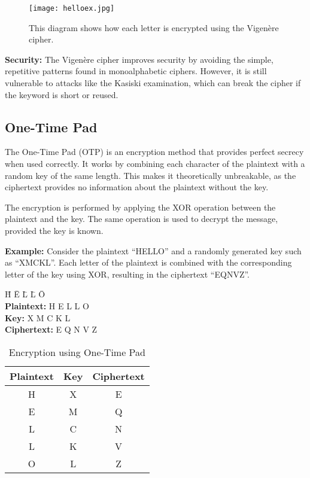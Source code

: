 \documentclass[a4paper,12pt]{article}
\begin{document}
\begin{figure}[H]
    \centering
    \texttt{[image: helloex.jpg]}  %
    \caption{This diagram shows how each letter is encrypted using the Vigenère cipher.}
    \label{fig:vigenere_example}
\end{figure}

\textbf{Security:} The Vigenère cipher improves security by avoiding the simple, repetitive patterns found in monoalphabetic ciphers. However, it is still vulnerable to attacks like the Kasiski examination, which can break the cipher if the keyword is short or reused.






\newpage  %

\subsection*{One-Time Pad}
The One-Time Pad (OTP) is an encryption method that provides perfect secrecy when used correctly. It works by combining each character of the plaintext with a random key of the same length. This makes it theoretically unbreakable, as the ciphertext provides no information about the plaintext without the key.

The encryption is performed by applying the XOR operation between the plaintext and the key. The same operation is used to decrypt the message, provided the key is known.

\textbf{Example:} Consider the plaintext ``HELLO'' and a randomly generated key such as ``XMCKL''. Each letter of the plaintext is combined with the corresponding letter of the key using XOR, resulting in the ciphertext ``EQNVZ''.

\begin{tabbing}
\hspace{3cm} \= H \= E \= L \= L \= O \\
\textbf{Plaintext:} \> H \> E \> L \> L \> O \\
\textbf{Key:} \> X \> M \> C \> K \> L \\
\textbf{Ciphertext:} \> E \> Q \> N \> V \> Z
\end{tabbing}

\begin{table}[H]
\centering
\begin{tabular}{|c|c|c|}
\hline
\textbf{Plaintext} & \textbf{Key} & \textbf{Ciphertext} \\ \hline
H & X & E \\ \hline
E & M & Q \\ \hline
L & C & N \\ \hline
L & K & V \\ \hline
O & L & Z \\ \hline
\end{tabular}
\caption{Encryption using One-Time Pad}
\label{table:otp_encryption}
\end{table}
\end{document}
